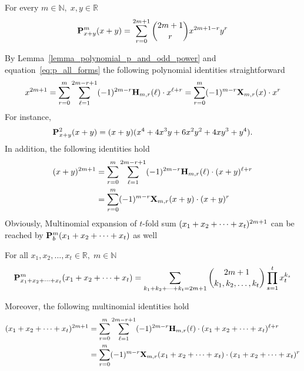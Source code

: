 \begin{lem}
    \label{lemma_polynomial_p_and_odd_power}
    For every $m\in\mathbb{N}, \; x,y\in\mathbb{R}$
    \begin{equation*}
        \polynomialP{m}{x+y}{x+y} = \sum_{r=0}^{2m+1} \binom{2m+1}{r} x^{2m+1-r} y^r
    \end{equation*}
\end{lem}
By Lemma~\ref{lemma_polynomial_p_and_odd_power} and equation~\eqref{eq:p_all_forms} the following
polynomial identities straightforward
\begin{equation*}
    x^{2m+1}
    =\sum_{r=0}^{m} \sum_{\ell=1}^{2m-r+1} (-1)^{2m-r} \coeffH{m}{r}{\ell} \cdot x^{\ell+r}
    =\sum_{r=0}^{m} (-1)^{m-r} \polynomialX{m}{r}{x} \cdot x^r
\end{equation*}
For instance,
\begin{equation*}
    \polynomialP{2}{x+y}{x+y} = (x + y) (x^4 + 4 x^3 y + 6 x^2 y^2 + 4 x y^3 + y^4).
\end{equation*}
In addition, the following identities hold
\begin{equation*}
    \begin{split}
    (x+y)
        ^{2m+1}
        &=\sum_{r=0}^{m} \sum_{\ell=1}^{2m-r+1} (-1)^{2m-r} \coeffH{m}{r}{\ell} \cdot (x+y)^{\ell+r} \\
        &=\sum_{r=0}^{m} (-1)^{m-r} \polynomialX{m}{r}{x+y} \cdot (x+y)^r
    \end{split}
\end{equation*}
Obviously, Multinomial expansion of $t$-fold sum $(\multifoldSum{t})^{2m+1}$ can be reached
by $\polynomialP{m}{b}{\multifoldSum{t}}$ as well
\begin{cor}
    For all $x_1,x_2,\ldots, x_t\in\mathbb{R}, \; m \in \mathbb{N}$
    \begin{equation*}
        \polynomialP{m}{\multifoldSum{t}}{\multifoldSum{t}}
        =
        \sum_{\multifoldSum[k]{t}=2m+1} \binom{2m+1}{k_1, k_2,\ldots, k_t} \prod_{s=1}^{t} x_t^{k_s}
    \end{equation*}
\end{cor}
Moreover, the following multinomial identities hold
\begin{equation*}
    \begin{split}
    (\multifoldSum{t})
        ^{2m+1}
        &=\sum_{r=0}^{m} \sum_{\ell=1}^{2m-r+1} (-1)^{2m-r} \coeffH{m}{r}{\ell} \cdot (\multifoldSum{t})^{\ell+r} \\
        &=\sum_{r=0}^{m} (-1)^{m-r} \polynomialX{m}{r}{\multifoldSum{t}} \cdot (\multifoldSum{t})^r
    \end{split}
\end{equation*}
